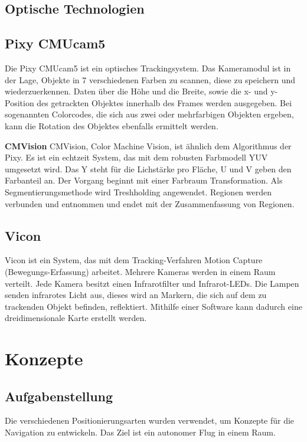     \subsection{Optische Technologien}
    \subsection*{Pixy CMUcam5}
    Die Pixy CMUcam5 ist ein optisches Trackingsystem. Das Kameramodul ist in der Lage, Objekte in 7 verschiedenen Farben zu scannen, diese zu speichern und wiederzuerkennen. Daten über die Höhe und die Breite, sowie die x- und y-Position des getrackten Objektes innerhalb des Frames werden ausgegeben. Bei sogenannten Colorcodes, die sich aus zwei oder mehrfarbigen Objekten ergeben, kann die Rotation des Objektes ebenfalls ermittelt werden.

    \textbf{CMVision}
    CMVision, Color Machine Vision, ist ähnlich dem Algorithmus der Pixy. Es ist ein echtzeit System, das mit dem robusten Farbmodell YUV umgesetzt wird. Das Y steht für die Lichstärke pro Fläche, U und V geben den Farbanteil an. Der Vorgang beginnt mit einer Farbraum Transformation. Als Segmentierungsmethode wird Treshholding angewendet. Regionen werden verbunden und entnommen und endet mit der Zusammenfassung von Regionen. \cite{Pixy} \cite{Pixy_Verfahren} \cite{Pixy_Verfahren2}

    \subsection*{Vicon}
    Vicon ist ein System, das mit dem Tracking-Verfahren Motion Capture (Bewegungs-Erfassung) arbeitet. 
    Mehrere Kameras werden in einem Raum verteilt. Jede Kamera besitzt einen Infrarotfilter und Infrarot-LEDs. Die Lampen senden infrarotes Licht aus, dieses wird an Markern, die sich auf dem zu trackenden Objekt befinden, reflektiert. Mithilfe einer Software kann dadurch eine dreidimensionale Karte erstellt werden.
    \cite{Vicon}

  \section{Konzepte}

    \subsection{Aufgabenstellung}
    Die verschiedenen Positionierungsarten wurden verwendet, um Konzepte für die Navigation zu entwickeln. Das Ziel ist ein autonomer Flug in einem Raum.

